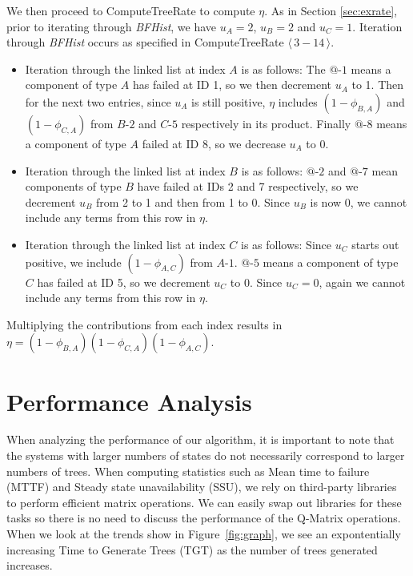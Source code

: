 \documentclass[12pt]{article}
\newcommand{\varName}[1]{\textrm{\it#1}}
\newcommand{\citeBlock}[2]{$\langle \, #1 - #2 \, \rangle$}
\newcommand{\nodeLabel}[2]{\mbox{$#1$-$#2$}}
\begin{document}
We then proceed to ComputeTreeRate to compute $\eta$. As in Section \ref{sec:exrate}, prior to iterating through \varName{BFHist}, we have $u_A = 2$, $u_B = 2$ and $u_C = 1$. Iteration through \varName{BFHist} occurs as specified in ComputeTreeRate \citeBlock{3}{14}.

\begin{itemize}
\item Iteration through the linked list at index $A$ is as follows: The \nodeLabel{@}{1} means a component of type $A$ has failed at ID 1, so we then decrement $u_{A}$ to 1. Then for the next two entries, since $u_{A}$ is still positive, $\eta$ includes $(1 - \phi_{B, A})$ and $(1 - \phi_{C, A})$ from \nodeLabel{B}{2} and \nodeLabel{C}{5} respectively in its product. Finally \nodeLabel{@}{8} means a component of type $A$ failed at ID 8, so we decrease $u_A$ to 0. 
\item Iteration through the linked list at index $B$ is as follows: \nodeLabel{@}{2} and \nodeLabel{@}{7} mean components of type $B$ have failed at IDs 2 and 7 respectively, so we decrement $u_{B}$ from 2 to 1 and then from 1 to 0. Since $u_{B}$ is now 0, we cannot include any terms from this row in $\eta$.
\item Iteration through the linked list at index $C$ is as follows: Since $u_{C}$ starts out positive, we include $(1 - \phi_{A, C})$ from \nodeLabel{A}{1}. \nodeLabel{@}{5} means a component of type $C$ has failed at ID 5, so we decrement $u_{C}$ to 0. Since $u_{C} = 0$, again we cannot include any terms from this row in $\eta$. 
\end{itemize}
Multiplying the contributions from each index results in $\eta = (1 - \phi_{B, A}) (1 - \phi_{C, A}) (1 - \phi_{A, C})$.
 
\section{Performance Analysis}
When analyzing the performance of our algorithm, it is important to note that the systems with larger
numbers of states do not necessarily correspond to larger numbers of trees.  When computing statistics
such as Mean time to failure (MTTF) and Steady state unavailability (SSU), we rely on third-party libraries to
perform efficient matrix operations.  We can easily swap out libraries for these tasks so there is no need
to discuss the performance of the Q-Matrix operations.  When we look at the trends show in Figure~\ref{fig:graph}, we see an expontentially increasing Time to Generate Trees (TGT) as the number of trees generated increases.
\end{document}
